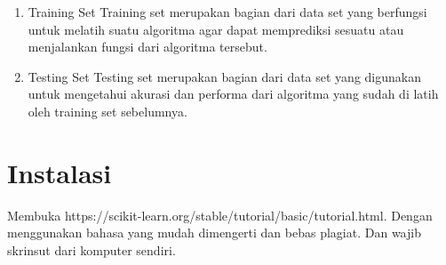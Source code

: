 \begin{enumerate}
\begin{enumerate}
		\item Training Set
		\newline Training set merupakan bagian dari data set yang berfungsi untuk melatih suatu algoritma agar dapat memprediksi sesuatu atau menjalankan fungsi dari algoritma tersebut.
		
		\item Testing Set
		\newline Testing set merupakan bagian dari data set yang digunakan untuk mengetahui akurasi dan performa dari algoritma yang sudah di latih oleh training set sebelumnya.
		
	\end{enumerate}
\end{enumerate}

\newpage
\section{Instalasi}
Membuka https://scikit-learn.org/stable/tutorial/basic/tutorial.html. Dengan menggunakan bahasa yang mudah dimengerti dan bebas plagiat. 
Dan wajib skrinsut dari komputer sendiri.
